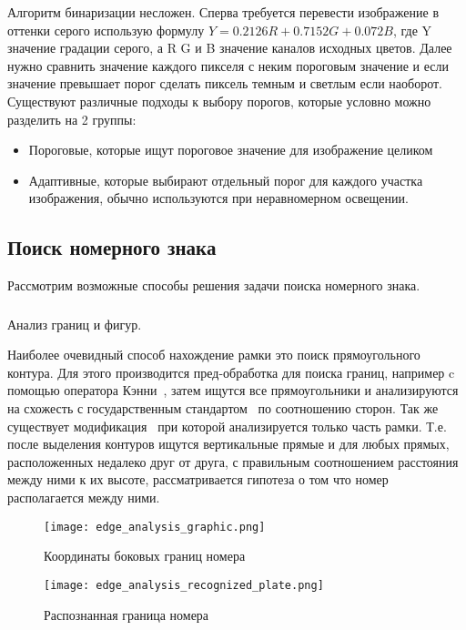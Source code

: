 Алгоритм бинаризации несложен. Сперва требуется перевести изображение в оттенки серого использую формулу $ Y = 0.2126R + 0.7152G + 0.072B $, где Y значение градации серого, а R G и B значение каналов исходных цветов. Далее нужно сравнить значение каждого пикселя с неким пороговым значение и если значение превышает порог сделать пиксель темным и светлым если наоборот. 
Существуют различные подходы к выбору порогов, которые условно можно разделить на 2 группы:
\begin{itemize}
  \item Пороговые, которые ищут пороговое значение для изображение целиком
  \item Адаптивные, которые выбирают отдельный порог для каждого участка изображения, обычно используются при неравномерном освещении.
\end{itemize}


\subsection{Поиск номерного знака}
\label{sub:domain:search}
Рассмотрим возможные способы решения задачи поиска номерного знака.
\subsubsection{}
\label{sub:domain:search:edges_analisys}
Анализ границ и фигур.

Наиболее очевидный способ нахождение рамки это поиск прямоугольного контура. Для этого производится пред-обработка для поиска границ, например c помощью оператора Кэнни~\cite{canny_edge_detector}, затем ищутся все прямоугольники и анализируются на схожесть с государственным стандартом~\cite{stb_914_99} по соотношению сторон. Так же существует модификация~\cite{recognition_using_hought} при которой анализируется только часть рамки. Т.е. после выделения контуров ищутся вертикальные прямые и для любых прямых, расположенных недалеко друг от друга, с правильным соотношением расстояния между ними к их высоте, рассматривается гипотеза о том что номер располагается между ними. 

\begin{figure}[ht]
\centering
    \texttt{[image: edge\_analysis\_graphic.png]}  
    \caption{Координаты боковых границ номера}
    \label{fig:domain:search:edges_analisys:edge_graphic}
\end{figure}

\begin{figure}[ht]
\centering
    \texttt{[image: edge\_analysis\_recognized\_plate.png]}  
    \caption{Распознанная граница номера}
    \label{fig:domain:search:edges_analisys:detected_edge}
\end{figure}

